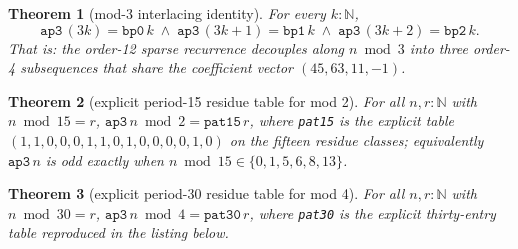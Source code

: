 \documentclass[11pt]{article}
\newtheorem{theorem}{Theorem}
\begin{document}
\begin{theorem}[mod-3 interlacing identity]\label{thm:interleave}
For every $k:\mathbb{N}$,
\[
\mathtt{ap3}\,(3k)=\mathtt{bp0}\,k
\;\wedge\;\mathtt{ap3}\,(3k+1)=\mathtt{bp1}\,k
\;\wedge\;\mathtt{ap3}\,(3k+2)=\mathtt{bp2}\,k .
\]
That is: the order-12 sparse recurrence decouples along $n\bmod 3$ into
three order-4 subsequences that share the coefficient vector
$(45,63,11,-1)$.
\end{theorem}

\begin{theorem}[explicit period-15 residue table for mod 2]\label{thm:mod2}
For all $n,r:\mathbb{N}$ with $n \bmod 15 = r$,
$\mathtt{ap3}\,n \bmod 2 = \mathtt{pat15}\,r$, where \texttt{pat15} is the
explicit table $(1,1,0,0,0,1,1,0,1,0,0,0,0,1,0)$ on the fifteen residue
classes; equivalently $\mathtt{ap3}\,n$ is odd exactly when
$n \bmod 15 \in \{0,1,5,6,8,13\}$.
\end{theorem}

\begin{theorem}[explicit period-30 residue table for mod 4]\label{thm:mod4}
For all $n,r:\mathbb{N}$ with $n \bmod 30 = r$,
$\mathtt{ap3}\,n \bmod 4 = \mathtt{pat30}\,r$, where \texttt{pat30} is the
explicit thirty-entry table reproduced in the listing below.
\end{theorem}
\end{document}
